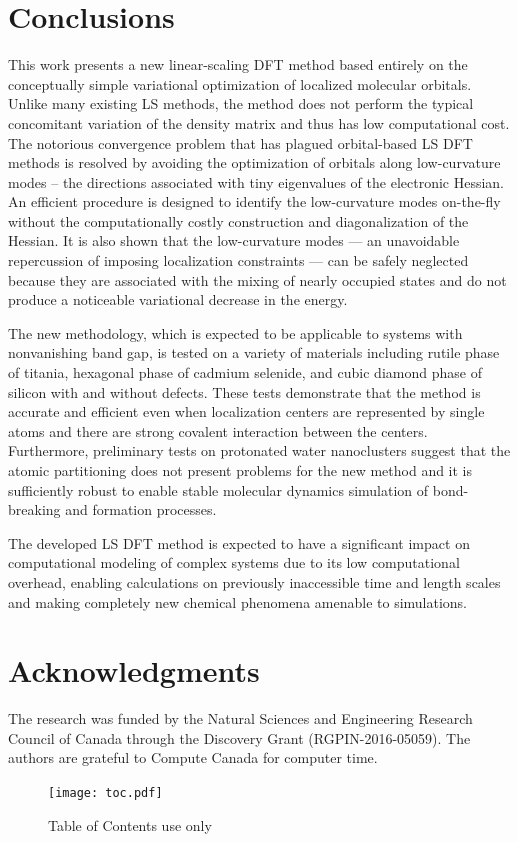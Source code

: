\documentclass[aps,prl,twocolumn,reprint,amsmath,amssymb]{revtex4-1}
\begin{document}
\section{Conclusions} 

This work presents a new linear-scaling DFT method based entirely on the conceptually simple variational optimization of localized molecular orbitals. 
Unlike many existing LS methods, the method does not perform the typical concomitant variation of the density matrix and thus has low computational cost. 
The notorious convergence problem that has plagued orbital-based LS DFT methods is resolved by avoiding the optimization of orbitals along low-curvature modes -- the directions associated with tiny eigenvalues of the electronic Hessian. 
An efficient procedure is designed to identify the low-curvature modes on-the-fly without the computationally costly construction and diagonalization of the Hessian. 
It is also shown that the low-curvature modes --- an unavoidable repercussion of imposing localization constraints --- can be safely neglected because they are associated with the mixing of nearly occupied states and do not produce a noticeable variational decrease in the energy. 

The new methodology, which is expected to be applicable to systems with nonvanishing band gap, is tested on a variety of materials including rutile phase of titania, hexagonal phase of cadmium selenide, and cubic diamond phase of silicon with and without defects. 
These tests demonstrate that the method is accurate and efficient even when localization centers are represented by single atoms and there are strong covalent interaction between the centers. 
Furthermore, preliminary tests on protonated water nanoclusters suggest that the atomic partitioning does not present problems for the new method and it is sufficiently robust to enable stable molecular dynamics simulation of bond-breaking and formation processes. 

The developed LS DFT method is expected to have a significant impact on computational modeling of complex systems due to its low computational overhead, enabling calculations on previously inaccessible time and length scales and making completely new chemical phenomena amenable to simulations.

\section{Acknowledgments} The research was funded by the Natural Sciences and Engineering Research Council of Canada through the Discovery Grant (RGPIN-2016-05059). The authors are grateful to Compute Canada for computer time.



\newpage
\newpage


\begin{figure}
\texttt{[image: toc.pdf]}
\caption{
Table of Contents use only
}
\label{fig:toc}
\end{figure}
\end{document}
